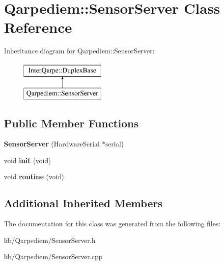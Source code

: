 \hypertarget{classQarpediem_1_1SensorServer}{}\section{Qarpediem\+:\+:Sensor\+Server Class Reference}
\label{classQarpediem_1_1SensorServer}
Inheritance diagram for Qarpediem\+:\+:Sensor\+Server\+:\begin{figure}[H]
\begin{center}
\leavevmode
\includegraphics[height=2.000000cm]{classQarpediem_1_1SensorServer}
\end{center}
\end{figure}
\subsection*{Public Member Functions}
\begin{DoxyCompactItemize}
\item 
\mbox{\label{classQarpediem_1_1SensorServer_a4f8ac8647c78cb0692f9e9eb5a8fdbcc}} 
{\bfseries Sensor\+Server} (Hardware\+Serial $\ast$serial)
\item 
\mbox{\label{classQarpediem_1_1SensorServer_ab44fff30274cd8f2665c1000d74f859b}} 
void {\bfseries init} (void)
\item 
\mbox{\label{classQarpediem_1_1SensorServer_a5231d90b3225f66d8a0935cab1ff59c3}} 
void {\bfseries routine} (void)
\end{DoxyCompactItemize}
\subsection*{Additional Inherited Members}


The documentation for this class was generated from the following files\+:\begin{DoxyCompactItemize}
\item 
lib/\+Qarpediem/Sensor\+Server.\+h\item 
lib/\+Qarpediem/Sensor\+Server.\+cpp\end{DoxyCompactItemize}

